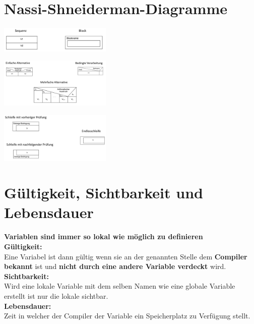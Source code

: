 \documentclass{article}
\begin{document}
\section{Nassi-Shneiderman-Diagramme}
\begin{multicols}{2}
\begin{center}
    \includegraphics[width=0.4\textwidth]{Nassi1.PNG}
\end{center}
    \columnbreak
\begin{center}
    \includegraphics[width=0.4\textwidth]{Nassi2.PNG}
\end{center}
    \columnbreak
\end{multicols}
\begin{center}
    \includegraphics[width=0.4\textwidth]{Nassi3.PNG}
\end{center}
\section{Gültigkeit, Sichtbarkeit und Lebensdauer}
\textbf{Variablen sind immer so lokal wie möglich zu definieren} \\
\textbf{Gültigkeit:}\\
Eine Variabel ist dann gültig wenn sie an der genannten Stelle dem \textbf{Compiler bekannt} ist und \textbf{nicht durch eine andere Variable verdeckt} wird. \\
\textbf{Sichtbarkeit:}\\
Wird eine lokale Variable mit dem selben Namen wie eine globale Variable erstellt ist nur die lokale sichtbar. \\
\textbf{Lebensdauer:}\\
Zeit in welcher der Compiler der Variable ein Speicherplatz zu Verfügung stellt.
\end{document}
